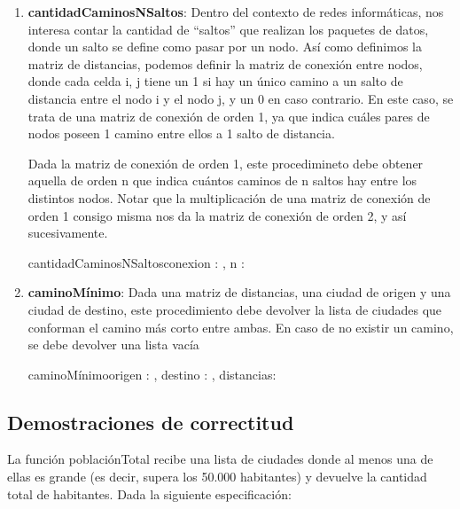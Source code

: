 \documentclass[10pt,a4paper]{article}
\begin{document}
\begin{enumerate}
        \item \textbf{cantidadCaminosNSaltos}: Dentro del contexto de redes inform\'aticas, nos interesa contar la cantidad de “saltos”
        que realizan los paquetes de datos, donde un salto se define como pasar por un nodo.
        As\'i como definimos la matriz de distancias, podemos definir la matriz de conexi\'on entre nodos, donde cada celda i, j
        tiene un 1 si hay un  \'unico camino a un salto de distancia entre el nodo i y el nodo j, y un 0 en caso contrario. En este
        caso, se trata de una matriz de conexi\'on de orden 1, ya que indica cu\'ales pares de nodos poseen 1 camino entre ellos a
        1 salto de distancia.

        Dada la matriz de conexi\'on de orden 1, este procedimineto debe obtener aquella de orden n que indica cu\'antos caminos
        de n saltos hay entre los distintos nodos. Notar que la multiplicaci\'on de una matriz de conexi\'on de orden 1 consigo
        misma nos da la matriz de conexi\'on de orden 2, y as\'i sucesivamente.

        \begin{proc}{cantidadCaminosNSaltos}{\Inout conexion : \TLista{\TLista{\ent}}, \In n : \ent}{}\end{proc}

        \item \textbf{caminoM\'inimo}: Dada una matriz de distancias, una ciudad de origen y una ciudad de destino, este procedimiento
        debe devolver la lista de ciudades que conforman el camino m\'as corto entre ambas. En caso de no existir un camino,
        se debe devolver una lista vac\'ia

        \begin{proc}{caminoM\'inimo}{\In origen : \ent, \In destino : \ent, \In distancias: \TLista{\TLista{\ent}}}{}\end{proc}
    \end{enumerate}

\subsection{Demostraciones de correctitud}

La funci\'on poblaci\'onTotal recibe una lista de ciudades donde al menos una de ellas es grande (es decir, supera los
50.000 habitantes) y devuelve la cantidad total de habitantes. Dada la siguiente especificaci\'on:
\end{document}
